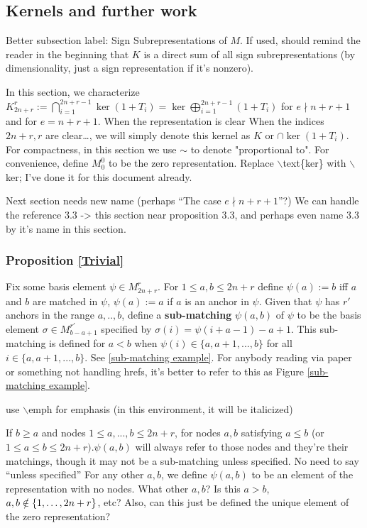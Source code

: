\documentclass{amsart}
\begin{document}
\subsection{Kernels and further work}

{\color{magenta} Better subsection label: Sign Subrepresentations of $M$. If used, should remind the reader in the beginning that $K$ is a direct sum of all sign subrepresentations (by dimensionality, just a sign representation if it's nonzero).}

In this section, we characterize $K_{2n+r}^r := \bigcap_{i=1}^{2n+r-1} \ker (1 + T_i) = \ker \bigoplus_{i = 1}^{2n + r - 1} (1 + T_i)$ for $e \nmid n + r + 1$ and for $e=n+r+1$. When the representation is clear {\color{magenta} When the indices $2n + r, r$ are clear\ldots}, we will simply denote this kernel as $K$ or $\cap\ker(1+T_i)$. For compactness, in this section we use $\sim $ to denote "proportional to". For convenience, define $M_0^0$ to be the zero representation.
{\color{magenta} Replace $\backslash$text\{ker\} with $\backslash$ker;
I've done it for this document already.}


{\color{magenta} Next section needs new name (perhaps ``The case $e \nmid n+r+1$''?) We can handle the reference 3.3 -> this section near proposition 3.3, and perhaps even name 3.3 by it's name in this section.}
\subsubsection{Proposition \ref{Trivial}}
\label{kernel}
\begin{definition}
	
	Fix some basis element $\psi\in M_{2n+r}^r$. For $1 \leq a,b \leq 2n + r$ define $\psi(a):=b$ iff $a$ and $b$ are matched in $\psi$, $\psi(a):=a$ if $a$ is an anchor in $\psi$. Given that $\psi$ has $r'$ anchors in the range $a,..,b$, define a \textbf{sub-matching} $\psi(a,b)$ of $\psi$ to be the basis element $\sigma\in M_{b-a+1}^{r'}$ specified by $\sigma(i)=\psi(i+a-1)-a+1$. This sub-matching is defined for $a<b$ when $\psi(i)\in \{a,a+1,...,b\}$ for all $i\in \{a,a+1,...,b\}$. See \ref{sub-matching example}.
  {\color{magenta} For anybody reading via paper or something not handling hrefs, it's better to refer to this as Figure \ref{sub-matching example}.}

  {\color{magenta} use $\backslash$emph for emphasis (in this environment, it will be italicized)}

  If $b\geq a$ and nodes $1\leq a,...,b\leq 2n+r$, {\color{magenta} for nodes $a,b$ satisfying $a \leq b$ (or $1 \leq a \leq b \leq 2n+r)$.}$\psi(a,b)$ will always refer to those nodes and they're {\color{magenta} their} matchings, though it may not be a sub-matching unless specified.{\color{magenta} No need to say ``unless specified''} For any other $a,b$, we define $\psi(a,b)$ to be an element of the representation with no nodes.{\color{magenta} What other $a,b$? Is this $a > b$, $a,b \notin \left\{ 1,\dots,2n+r \right\}$, etc? Also, can this just be defined the unique element of the zero representation?}
	
	\label{sub-matchings}
\end{definition}
\end{document}
